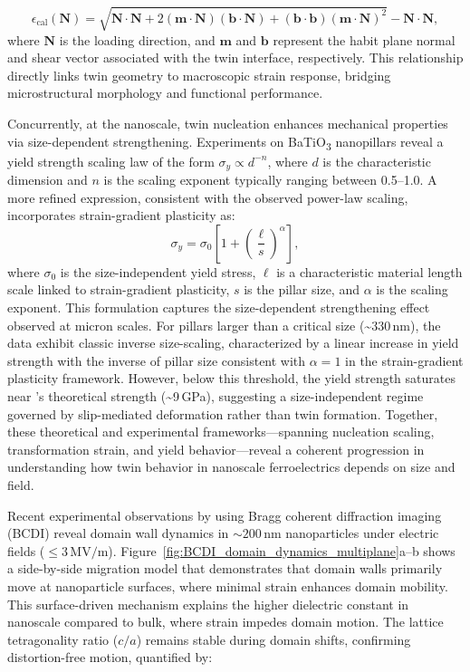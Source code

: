 \documentclass[a4paper,fleqn]{cas-sc}
\begin{document}
\begin{equation}
\epsilon_{\text{cal}}(\mathbf{N}) = \sqrt{
\mathbf{N} \cdot \mathbf{N} + 2 (\mathbf{m} \cdot \mathbf{N})(\mathbf{b} \cdot \mathbf{N}) + (\mathbf{b} \cdot \mathbf{b})(\mathbf{m} \cdot \mathbf{N})^2
} - \mathbf{N} \cdot \mathbf{N},
\end{equation}
where \(\mathbf{N}\) is the loading direction, and \(\mathbf{m}\) and \(\mathbf{b}\) represent the habit plane normal and shear vector associated with the twin interface, respectively. This relationship directly links twin geometry to macroscopic strain response, bridging microstructural morphology and functional performance.
\par Concurrently, at the nanoscale, twin nucleation enhances mechanical properties via size-dependent strengthening. Experiments on BaTiO\textsubscript{3} nanopillars reveal a yield strength scaling law of the form $\sigma_y \propto d^{-n}$, where $d$ is the characteristic dimension and $n$ is the scaling exponent typically ranging between 0.5--1.0. A more refined expression, consistent with the observed power-law scaling, incorporates strain-gradient plasticity as:
\begin{equation}
\sigma_y = \sigma_0 \left[ 1 + \left( \frac{\ell}{s} \right)^\alpha \right],
\label{eq:size_scaling}
\end{equation}
where $\sigma_0$ is the size-independent yield stress, $\ell$ is a characteristic material length scale linked to strain-gradient plasticity, $s$ is the pillar size, and $\alpha$ is the scaling exponent. This formulation captures the size-dependent strengthening effect observed at micron scales. For pillars larger than a critical size (\textasciitilde330\,nm), the data exhibit classic inverse size-scaling, characterized by a linear increase in yield strength with the inverse of pillar size consistent with  $\alpha = 1$ in the strain-gradient plasticity framework. However,  below this threshold, the yield strength saturates near 's theoretical strength (\textasciitilde9\,GPa), suggesting a size-independent regime governed by slip-mediated deformation rather than twin formation. Together, these theoretical and experimental frameworks—spanning nucleation scaling, transformation strain, and yield behavior—reveal a coherent progression in understanding how twin behavior in nanoscale ferroelectrics depends on size and field.
\par Recent experimental observations by \cite{liu2025electric} using Bragg coherent diffraction imaging (BCDI) reveal domain wall dynamics in $\sim\!200\,\mathrm{nm}$  nanoparticles under electric fields ($\leq\!3\,\mathrm{MV/m}$). Figure~\ref{fig:BCDI_domain_dynamics_multiplane}a--b shows a side-by-side migration model that demonstrates that domain walls primarily move at nanoparticle surfaces, where minimal strain enhances domain mobility. This surface-driven mechanism explains the higher dielectric constant in nanoscale  compared to bulk, where strain impedes domain motion. The lattice tetragonality ratio ($c/a$) remains stable during domain shifts, confirming distortion-free motion, quantified by:
\end{document}
